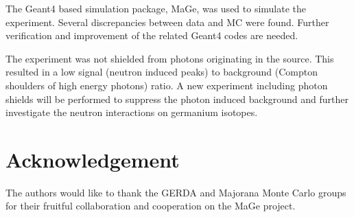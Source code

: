 \documentclass{elsart}
\begin{document}
The Geant4 based simulation package, MaGe, was used to simulate the
experiment. Several discrepancies between data and MC were
found. Further verification and improvement of the related Geant4
codes are needed.

The experiment was not shielded from photons originating in the
source. This resulted in a low signal (neutron induced peaks) to
background (Compton shoulders of high energy photons) ratio. A new
experiment including photon shields will be performed to suppress the
photon induced background and further investigate the neutron
interactions on germanium isotopes.

\section{Acknowledgement}
\label{sec:ack}
The authors would like to thank the GERDA and Majorana Monte Carlo
groups for their fruitful collaboration and cooperation on the MaGe
project.


\end{document}
